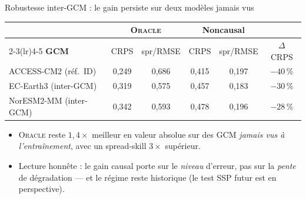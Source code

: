 \documentclass[aspectratio=169,10pt]{beamer}
\newcommand{\Oracle}{\textsc{Oracle}}
\newcommand{\tgood}[1]{\textcolor{green!40!black}{\textbf{#1}}}
\begin{document}
\begin{frame}{Robustesse inter-GCM : le gain persiste sur deux modèles jamais vus}
  \centering
  \small
  \begin{tabular}{l cc cc c}
    \toprule
    & \multicolumn{2}{c}{\Oracle{}} & \multicolumn{2}{c}{\textbf{Noncausal}} & \\
    \cmidrule(lr){2-3}\cmidrule(lr){4-5}
    \textbf{GCM} & CRPS & spr/RMSE & CRPS & spr/RMSE & $\Delta$ CRPS \\
    \midrule
    ACCESS-CM2 (réf.\ ID)   & 0,249 & 0,686 & 0,415 & 0,197 & \tgood{$-40\,\%$} \\
    EC-Earth3 (inter-GCM)   & 0,319 & 0,575 & 0,457 & 0,183 & \tgood{$-30\,\%$} \\
    NorESM2-MM (inter-GCM)  & 0,342 & 0,593 & 0,478 & 0,196 & \tgood{$-28\,\%$} \\
    \bottomrule
  \end{tabular}
  \par\vspace{0.25cm}
  \begin{itemize}
    \item \Oracle{} reste $1{,}4\times$ meilleur en valeur absolue sur des GCM
          \emph{jamais vus à l'entraînement}, avec un spread-skill $3\times$ supérieur.
    \item Lecture honnête : le gain causal porte sur le \emph{niveau} d'erreur, pas sur
          la \emph{pente} de dégradation --- et le régime reste historique
          (le test SSP futur est en perspective).
  \end{itemize}
\end{frame}
\end{document}
